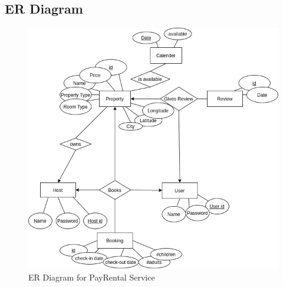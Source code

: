 \documentclass[10pt]{article}
\begin{document}
\subsection{ER Diagram }
\begin{figure}[h]
\centering
\includegraphics[scale=0.8]{er_diagram.png} 
\caption{ER Diagram for PayRental Service }
\end{figure}
\end{document}
